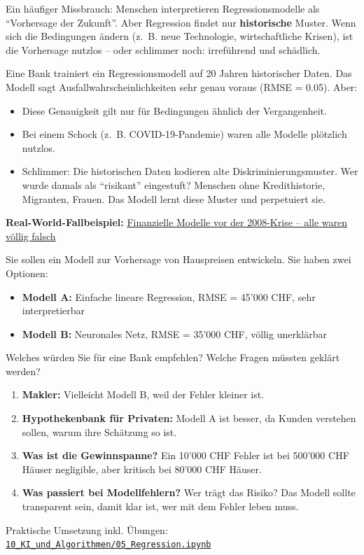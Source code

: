 \begin{mydefinition}
Ein häufiger Missbrauch: Menschen interpretieren Regressionsmodelle als \enquote{Vorhersage der Zukunft}. Aber Regression findet nur \textbf{historische} Muster. Wenn sich die Bedingungen ändern (z.~B. neue Technologie, wirtschaftliche Krisen), ist die Vorhersage nutzlos -- oder schlimmer noch: irreführend und schädlich.
\end{mydefinition}

\begin{myexample}
Eine Bank trainiert ein Regressionsmodell auf 20 Jahren historischer Daten. Das Modell sagt Ausfallwahrscheinlichkeiten sehr genau voraus (RMSE = 0.05). Aber:
\begin{itemize}
    \item Diese Genauigkeit gilt nur für Bedingungen ähnlich der Vergangenheit.
    \item Bei einem Schock (z.~B. COVID-19-Pandemie) waren alle Modelle plötzlich nutzlos.
    \item Schlimmer: Die historischen Daten kodieren alte Diskriminierungsmuster. Wer wurde damals als \enquote{risikant} eingestuft? Menschen ohne Kredithistorie, Migranten, Frauen. Das Modell lernt diese Muster und perpetuiert sie.
\end{itemize}
\textbf{Real-World-Fallbeispiel:} \href{https://en.wikipedia.org/wiki/2008_financial_crisis}{Finanzielle Modelle vor der 2008-Krise -- alle waren völlig falsch}
\end{myexample}

\begin{mychallenge}
Sie sollen ein Modell zur Vorhersage von Hauspreisen entwickeln. Sie haben zwei Optionen:
\begin{itemize}
    \item \textbf{Modell A:} Einfache lineare Regression, RMSE = 45'000 CHF, sehr interpretierbar
    \item \textbf{Modell B:} Neuronales Netz, RMSE = 35'000 CHF, völlig unerklärbar
\end{itemize}
Welches würden Sie für eine Bank empfehlen? Welche Fragen müssten geklärt werden?
\begin{myanswer}
    \begin{enumerate}
        \item \textbf{Makler:} Vielleicht Modell B, weil der Fehler kleiner ist.
        \item \textbf{Hypothekenbank für Privaten:} Modell A ist besser, da Kunden verstehen sollen, warum ihre Schätzung so ist.
        \item \textbf{Was ist die Gewinnspanne?} Ein 10'000 CHF Fehler ist bei 500'000 CHF Häuser negligible, aber kritisch bei 80'000 CHF Häuser.
        \item \textbf{Was passiert bei Modellfehlern?} Wer trägt das Risiko? Das Modell sollte transparent sein, damit klar ist, wer mit dem Fehler leben muss.
    \end{enumerate}
\end{myanswer}
\end{mychallenge}

\begin{myremark}[Notebook]
Praktische Umsetzung inkl. Übungen:
\href{\notebookurl}{\texttt{10\_KI\_und\_Algorithmen/05\_Regression.ipynb}}
\end{myremark}
